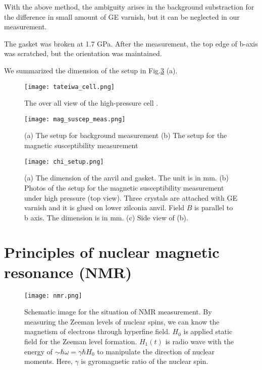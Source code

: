 With the above method, the ambiguity arises in the background substraction for the difference in small amount of GE varnish, but it can be neglected in our measurement.

The gasket was broken at 1.7 GPa.
After the measurement, the top edge of b-axis was scratched, but the orientation was maintained.

We summarized the dimension of the setup in Fig.\ref{chi_setup} (a).

\begin{figure}
  \centering
  \texttt{[image: tateiwa\_cell.png]}
  \caption{The over all view of the high-pressure cell \cite{Tateiwa2011}.}
  \label{tateiwa_cell}
\end{figure}

\begin{figure}
  \centering
  \texttt{[image: mag\_suscep\_meas.png]}
  \caption{(a) The setup for background measurement
  (b) The setup for the magnetic susceptibility measurement}
  \label{chi_meas_setup}
\end{figure}

\begin{figure}
  \centering
  \texttt{[image: chi\_setup.png]}
  \caption{(a) The dimension of the anvil and gasket. The unit is in mm.
  (b) Photos of the setup for the magnetic susceptibility measurement under high pressure (top view).
  Three crystals are attached with GE varnish and it is glued on lower zilconia anvil.
  Field $B$ is parallel to b axis.
  The dimension is in mm.
  (c) Side view of (b).}
  \label{chi_setup}
\end{figure}

\newpage
\section{Principles of nuclear magnetic resonance (NMR)}

\begin{figure}[h]
  \centering
  \texttt{[image: nmr.png]}
  \caption{Schematic image for the situation of NMR measurement.
  By measuring the Zeeman levels of nuclear spins, we can know the magnetism of electrons through hyperfine field.
  $H_0$ is applied static field for the Zeeman level formation.
  $H_1(t)$ is radio wave with the energy of $\sim\hbar\omega = \gamma\hbar H_0$ to manipulate the direction of nuclear moments.
  Here, $\gamma$ is gyromagnetic ratio of the nuclear spin.}
  \label{nmr}
\end{figure}

